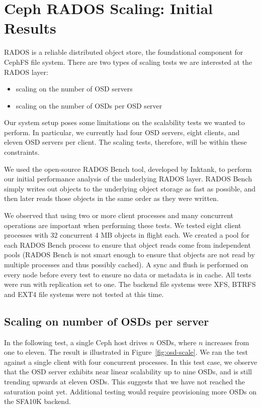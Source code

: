 \section{Ceph RADOS Scaling: Initial Results}

RADOS is a reliable distributed object store, the foundational component for
CephFS file system. There are two types of scaling tests we are interested at
the RADOS layer:

\begin{itemize}
  \item scaling on the number of OSD servers
  \item scaling on the number of OSDs per OSD server
\end{itemize}

Our system setup poses some limitations on the scalability tests we wanted to
perform. In particular, we currently had four OSD servers, eight clients, and
eleven OSD servers per client. The scaling tests, therefore, will be within
these constraints.

We used the open-source RADOS Bench tool, developed by Inktank, to perform our
initial performance analysis of the underlying RADOS layer.  RADOS Bench simply
writes out objects to the underlying object storage as fast as possible, and
then later reads those objects in the same order as they were written.

We observed that using two or more client processes and many concurrent
operations are important when performing these tests.  We tested eight client processes 
with 32 concurrent 4 MB objects in flight each. We created a pool for
each RADOS Bench process to ensure that object reads come from independent pools
(RADOS Bench is not smart enough to ensure that objects are not read by multiple
processes and thus possibly cached).  A sync and flush is performed on every
node before every test to ensure no data or metadata is in cache.  All tests
were run with replication set to one.  The backend file systems were XFS,
BTRFS and EXT4 file systems were not tested at this time.


\subsection{Scaling on number of OSDs per server}

In the following test, a single Ceph host drives $n$ OSDs, where $n$ increases
from one to eleven. The result is illustrated in Figure~\ref{fig:osd-scale}.
We ran the test against a single client with four concurrent processes. In this
test case, we observe that the OSD server exhibits near linear scalability up to
nine OSDs, and is still trending upwards at eleven OSDs. This suggests that we
have not reached the saturation point yet. Additional testing would require
provisioning more OSDs on the SFA10K backend.



